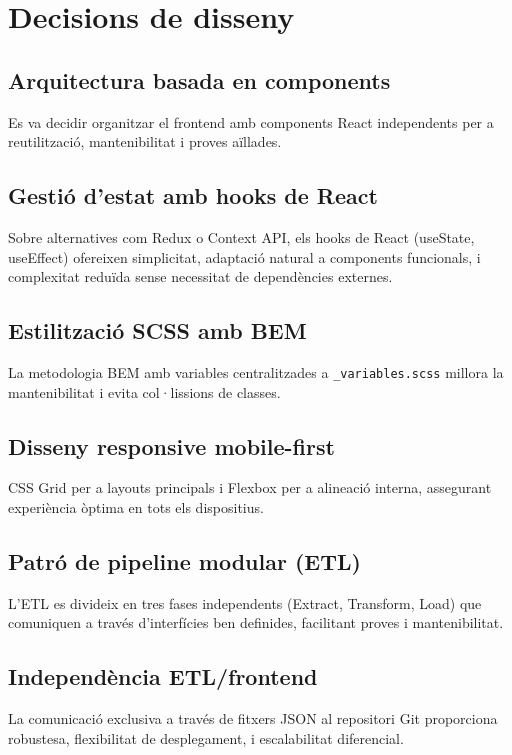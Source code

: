 \section{Decisions de disseny}

\subsection{Arquitectura basada en components}
Es va decidir organitzar el frontend amb components React independents per a reutilització, mantenibilitat i proves aïllades.

\subsection{Gestió d'estat amb hooks de React}
Sobre alternatives com Redux o Context API, els hooks de React (useState, useEffect) ofereixen simplicitat, adaptació natural a components funcionals, i complexitat reduïda sense necessitat de dependències externes.

\subsection{Estilització SCSS amb BEM}
La metodologia BEM amb variables centralitzades a \texttt{\_variables.scss} millora la mantenibilitat i evita col·lissions de classes.

\subsection{Disseny responsive mobile-first}
CSS Grid per a layouts principals i Flexbox per a alineació interna, assegurant experiència òptima en tots els dispositius.

\subsection{Patró de pipeline modular (ETL)}
L'ETL es divideix en tres fases independents (Extract, Transform, Load) que comuniquen a través d'interfícies ben definides, facilitant proves i mantenibilitat.

\subsection{Independència ETL/frontend}
La comunicació exclusiva a través de fitxers JSON al repositori Git proporciona robustesa, flexibilitat de desplegament, i escalabilitat diferencial.

